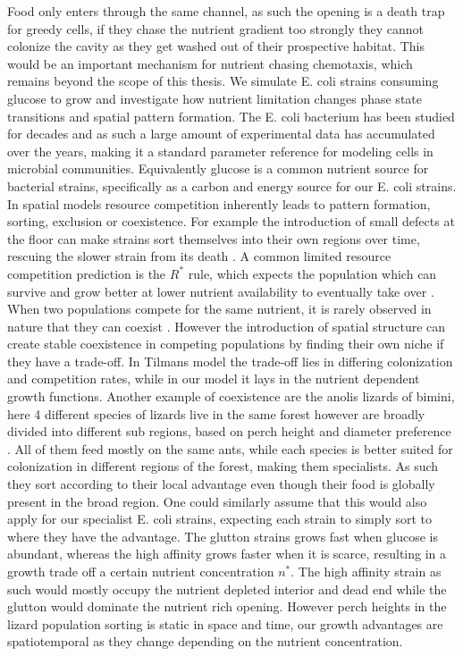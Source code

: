 \documentclass[11pt,a4paper]{report}
\begin{document}
	Food only enters through the same channel, as such the opening is a death trap for greedy cells, if they chase the nutrient gradient too strongly they cannot colonize the cavity as they get washed out of their prospective habitat. This would be an important mechanism for nutrient chasing chemotaxis, which remains beyond the scope of this thesis. We simulate E. coli strains consuming glucose to grow and investigate how nutrient limitation changes phase state transitions and spatial pattern formation. The E. coli bacterium has been studied for decades and as such a large amount of experimental data has accumulated over the years, making it a standard parameter reference for modeling cells in microbial communities. Equivalently glucose is a common nutrient source for bacterial strains, specifically as a carbon and energy source for our E. coli strains. In spatial models resource competition inherently leads to pattern formation, sorting, exclusion or coexistence. For example the introduction of small defects at the floor can make strains sort themselves into their own regions over time, rescuing the slower strain from its death \cite{slepukhin}. A common limited resource competition prediction is the $R^*$ rule, which expects the population which can survive and grow better at lower nutrient availability to eventually take over \cite{rstar}. When two populations compete for the same nutrient, it is rarely observed in nature that they can coexist \cite{Murray}. However the introduction of spatial structure can create stable coexistence in competing populations by finding their own niche if they have a trade-off\cite{Tilman}. In Tilmans model the trade-off lies in differing colonization and competition rates, while in our model it lays in the nutrient dependent growth functions. Another example of coexistence are the anolis lizards of bimini, here 4 different species of lizards live in the same forest however are broadly divided into different sub regions, based on perch height and diameter preference \cite{lizard}. All of them feed mostly on the same ants, while each species is better suited for colonization in different regions of the forest, making them specialists. As such they sort according to their local advantage even though their food is globally present in the broad region. One could similarly assume that this would also apply for our specialist E. coli strains, expecting each strain to simply sort to where they have the advantage. The glutton strains grows fast when glucose is abundant, whereas the high affinity grows faster when it is scarce, resulting in a growth trade off a certain nutrient concentration $n^*$. The high affinity strain as such would mostly occupy the nutrient depleted interior and dead end while the glutton would dominate the nutrient rich opening. However perch heights in the lizard population sorting is static in space and time, our growth advantages are spatiotemporal as they change depending on the nutrient concentration.\\
\end{document}
